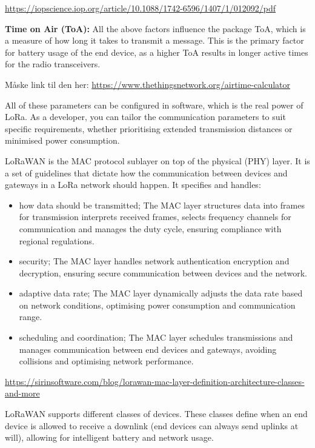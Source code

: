 \url{https://iopscience.iop.org/article/10.1088/1742-6596/1407/1/012092/pdf}

\textbf{Time on Air (ToA):} All the above factors influence the package \ac{ToA}, which is a measure of how long it takes to transmit a message. This is the primary factor for battery usage of the end device, as a higher \ac{ToA} results in longer active times for the radio transceivers.

Måske link til den her: \url{https://www.thethingsnetwork.org/airtime-calculator}

All of these parameters can be configured in software, which is the real power of LoRa. As a developer, you can tailor the communication parameters to suit specific requirements, whether prioritising extended transmission distances or minimised power consumption.

\ac{LoRaWAN} is the \ac{MAC} protocol sublayer on top of the physical (PHY) layer. It is a set of guidelines that dictate how the communication between devices and gateways in a \ac{LoRa} network should happen. It specifies and handles:
\begin{itemize}
    \item how data should be transmitted; The \ac{MAC} layer structures data into frames for transmission interprets received frames, selects frequency channels for communication and manages the duty cycle, ensuring compliance with regional regulations.
    \item security; The \ac{MAC} layer handles network authentication encryption and decryption, ensuring secure communication between devices and the network.
    \item adaptive data rate; The \ac{MAC} layer dynamically adjusts the data rate based on network conditions, optimising power consumption and communication range.
    \item scheduling and coordination; The \ac{MAC} layer schedules transmissions and manages communication between end devices and gateways, avoiding collisions and optimising network performance.
\end{itemize}

\url{https://sirinsoftware.com/blog/lorawan-mac-layer-definition-architecture-classes-and-more}

\ac{LoRaWAN} supports different classes of devices. These classes define when an end device is allowed to receive a downlink (end devices can always send uplinks at will), allowing for intelligent battery and network usage.


